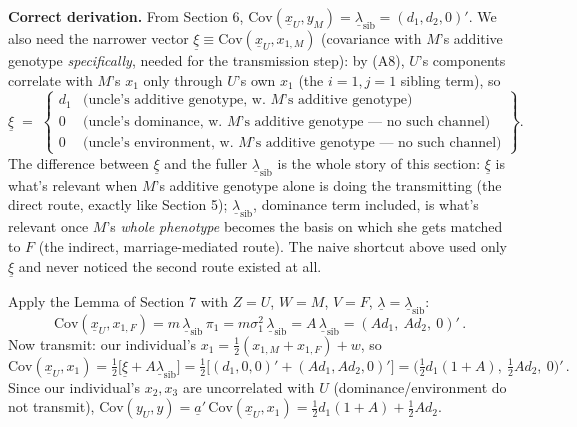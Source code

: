 \documentclass[12pt]{article}
\begin{document}
\textbf{Correct derivation.} From Section 6, $\mathrm{Cov}(\underline x_U,y_M)=\underline\lambda_{\mathrm{sib}}=(d_1,d_2,0)'$. We also need the narrower vector $\underline\xi\equiv\mathrm{Cov}(\underline x_U,x_{1,M})$ (covariance with $M$'s additive genotype \emph{specifically}, needed for the transmission step): by (A8), $U$'s components correlate with $M$'s $x_1$ only through $U$'s own $x_1$ (the $i=1,j=1$ sibling term), so
\begin{equation*}
\underline\xi \;=\;
\left\{\begin{array}{ll}
d_1 & \text{(uncle's additive genotype, w.\ }M\text{'s additive genotype)} \\
0 & \text{(uncle's dominance, w.\ }M\text{'s additive genotype --- no such channel)} \\
0 & \text{(uncle's environment, w.\ }M\text{'s additive genotype --- no such channel)}
\end{array}\right\} .
\end{equation*}
The difference between $\underline\xi$ and the fuller $\underline\lambda_{\mathrm{sib}}$ is the whole story of this section: $\underline\xi$ is what's relevant when $M$'s additive genotype alone is doing the transmitting (the direct route, exactly like Section 5); $\underline\lambda_{\mathrm{sib}}$, dominance term included, is what's relevant once $M$'s \emph{whole phenotype} becomes the basis on which she gets matched to $F$ (the indirect, marriage-mediated route). The naive shortcut above used only $\underline\xi$ and never noticed the second route existed at all.

Apply the Lemma of Section 7 with $Z=U$, $W=M$, $V=F$, $\underline\lambda=\underline\lambda_{\mathrm{sib}}$:
\begin{equation}
\mathrm{Cov}(\underline x_U,x_{1,F}) = m\,\underline\lambda_{\mathrm{sib}}\,\pi_1 = m\sigma_1^2\,\underline\lambda_{\mathrm{sib}} = A\,\underline\lambda_{\mathrm{sib}} = (Ad_1,\ Ad_2,\ 0)' \, .
\end{equation}
Now transmit: our individual's $x_1=\tfrac12(x_{1,M}+x_{1,F})+w$, so
\begin{equation}
\mathrm{Cov}(\underline x_U,x_1) = \tfrac12\big[\underline\xi + A\underline\lambda_{\mathrm{sib}}\big] = \tfrac12\Big[(d_1,0,0)' + (Ad_1,Ad_2,0)'\Big] = \Big(\tfrac12d_1(1+A),\ \tfrac12Ad_2,\ 0\Big)' \, .
\end{equation}
Since our individual's $x_2,x_3$ are uncorrelated with $U$ (dominance/environment do not transmit), $\mathrm{Cov}(y_U,y)=\underline a'\,\mathrm{Cov}(\underline x_U,x_1) = \tfrac12d_1(1+A) + \tfrac12Ad_2$.
\end{document}
